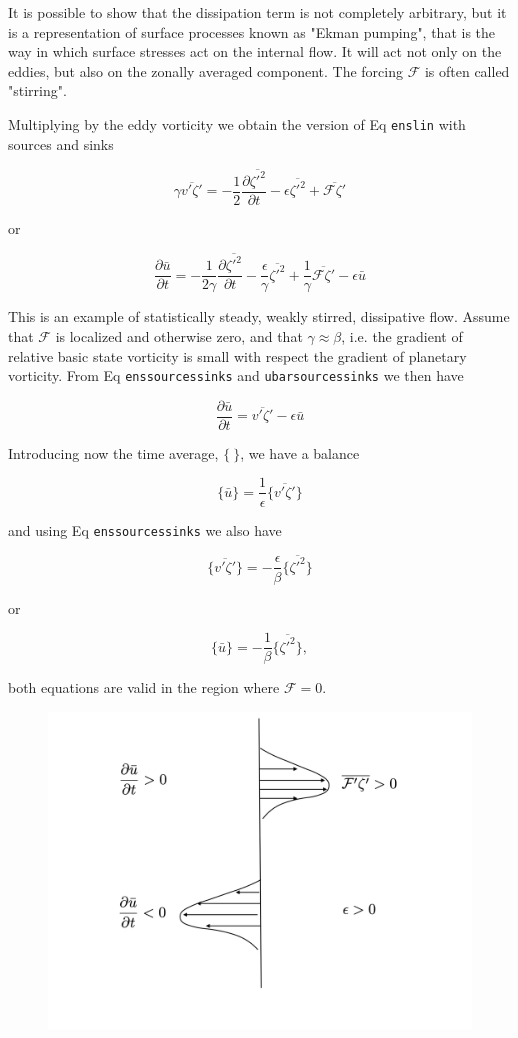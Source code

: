 It is possible to show that the dissipation term is not completely
arbitrary, but it is a representation of surface processes known as
"Ekman pumping", that is the way in which surface stresses act on the
internal flow. It will act not only on the eddies, but also on the
zonally averaged component. The forcing \(\mathcal{F}\) is often called
"stirring".

Multiplying by the eddy vorticity we obtain the version of Eq
\texttt{enslin} with sources and sinks

{\[\gamma\overline{v'\zeta'}= -\frac{1}{2}\frac{\partial \overline{\zeta'^2}}{\partial t} -\epsilon\overline{\zeta'^2}+\overline{\mathcal{F}\zeta'}\]}

or

{\[\frac{\partial \bar{u}}{\partial t} = -\frac{1}{2\gamma}\frac{\partial \overline{\zeta'^2}}{\partial t} -\frac{\epsilon}{\gamma}\overline{\zeta'^2}+\frac{1}{\gamma}\overline{\mathcal{F}\zeta'} -\epsilon\bar{u}\]}

This is an example of statistically steady, weakly stirred, dissipative
flow. Assume that \(\mathcal{F}\) is localized and otherwise zero, and
that \(\gamma \approx \beta\), i.e. the gradient of relative basic state
vorticity is small with respect the gradient of planetary vorticity.
From Eq \texttt{enssourcessinks} and \texttt{ubarsourcessinks} we then
have

\[\frac{\partial \bar{u}}{\partial t} = \overline{v'\zeta'} - \epsilon \bar{u}\]

Introducing now the time average, \(\{ \ \}\), we have a balance

\[\{ \bar{u}\} = \frac{1}{\epsilon}\{ \overline{v'\zeta'}\}\]

and using Eq \texttt{enssourcessinks} we also have

\[\{ \overline{v'\zeta'}\} = -\frac{\epsilon}{\beta}\{ \overline{\zeta'^2}\}\]

or

\[\{ \bar{u}\} = -\frac{1}{\beta}\{ \overline{\zeta'^2}\} ,\]

both equations are valid in the region where \(\mathcal{F}=0\).



\begin{figure}
\centering
\includegraphics[width= .8 \textwidth]{figs/GD/ubarF.png}
\caption{}
\label{fig:}
\end{figure}

